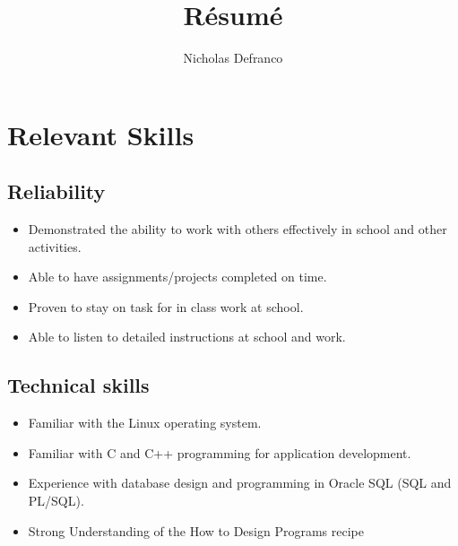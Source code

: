 \documentclass{article}
\begin{document}
\title{R\'esum\'e}
\author{Nicholas Defranco}

\maketitle


\section{Relevant Skills}

\subsection{Reliability}

\begin{itemize}

\item Demonstrated the ability to work with others effectively in school and
	other activities.

\item Able to have assignments/projects completed on time.

\item Proven to stay on task for in class work at school.

\item Able to listen to detailed instructions at school and work.

\end{itemize}

\subsection{Technical skills}

\begin{itemize}

\item Familiar with the Linux operating system.

\item Familiar with C and C++ programming for application development.

\item Experience with database design and programming in Oracle SQL (SQL and
	PL/SQL).

\item Strong Understanding of the How to Design Programs recipe

\end{itemize}
\end{document}
